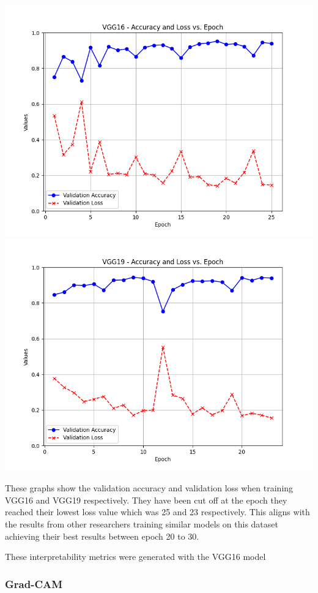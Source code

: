 \documentclass[
	a4paper,
	10pt,
	unnumberedsections,
	twoside,
]{research_article}
\begin{document}
\newpage
\begin{center}
	\includegraphics[width=0.89\linewidth]{images/vgg16_val_accuracy-lossVepoch.png}
	\includegraphics[width=0.89\linewidth]{images/vgg19_val_accuracy-lossVepoch.png}
\end{center}

These graphs show the validation accuracy and validation loss when training VGG16 and VGG19 respectively. They have been cut off at the epoch they reached their lowest loss value which was 25 and 23 respectively. This aligns with the results from other researchers training similar models on this dataset achieving their best results between epoch 20 to 30.

\newpage
These interpretability metrics were generated with the VGG16 model

\subsubsection{Grad-CAM}
\end{document}

